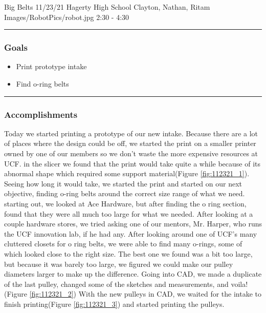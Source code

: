 \insertmeeting 
	{Big Belts} 
	{11/23/21}
	{Hagerty High School}
	{Clayton, Nathan, Ritam}
	{Images/RobotPics/robot.jpg}
	{2:30 - 4:30}
	
\noindent\hfil\rule{\textwidth}{.4pt}\hfil
\subsubsection*{Goals}
\begin{itemize}
    \item Print prototype intake
    \item Find o-ring belts


\end{itemize} 

\noindent\hfil\rule{\textwidth}{.4pt}\hfil

\subsubsection*{Accomplishments}
Today we started printing a prototype of our new intake. Because there are a lot of places where the design could be off, we started the print on a smaller printer owned by one of our members so we don’t waste the more expensive resources at UCF. in the slicer we found that the print would take quite a while because of its abnormal shape which required some support material(Figure \ref{fig:112321_1}). Seeing how long it would take, we started the print and started on our next objective, finding o-ring belts around the correct size range of what we need. starting out, we looked at Ace Hardware, but after finding the o ring section, found that they were all much too large for what we needed. After looking at a couple hardware stores, we tried asking one of our mentors, Mr. Harper, who runs the UCF innovation lab, if he had any. After looking around one of UCF’s many cluttered closets for o ring belts, we were able to find many o-rings, some of which looked close to the right size. The best one we found was a bit too large, but because it was barely too large, we figured we could make our pulley diameters larger to make up the difference. Going into CAD, we made a duplicate of the last pulley, changed some of the sketches and measurements, and voila! (Figure \ref{fig:112321_2}) With the new pulleys in CAD, we waited for the intake to finish printing(Figure \ref{fig:112321_3}) and started printing the pulleys.


